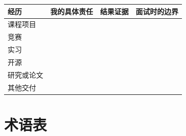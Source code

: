 \documentclass[UTF8,zihao=5,openany]{ctexbook}
\begin{document}
\begin{longtable}{p{}p{}p{}p{}}
\toprule
经历 & 我的具体责任 & 结果证据 & 面试时的边界 \\
\midrule
\endhead
课程项目 & & & \\
竞赛 & & & \\
实习 & & & \\
开源 & & & \\
研究或论文 & & & \\
其他交付 & & & \\
\bottomrule
\end{longtable}

\chapter{术语表}
\end{document}
